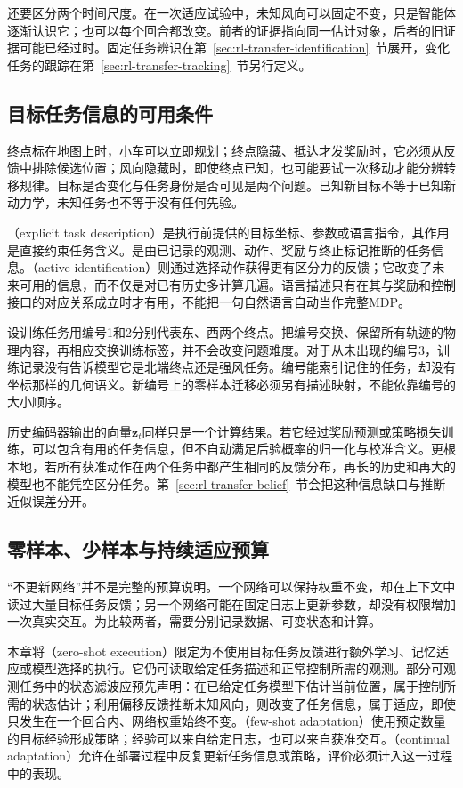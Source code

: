 还要区分两个时间尺度。在一次适应试验中，未知风向可以固定不变，只是智能体逐渐认识它；也可以每个回合都改变。前者的证据指向同一估计对象，后者的旧证据可能已经过时。固定任务辨识在第~\ref{sec:rl-transfer-identification}~节展开，变化任务的跟踪在第~\ref{sec:rl-transfer-tracking}~节另行定义。

\subsection{目标任务信息的可用条件}
\label{sec:rl-transfer-information}

终点标在地图上时，小车可以立即规划；终点隐藏、抵达才发奖励时，它必须从反馈中排除候选位置；风向隐藏时，即使终点已知，也可能要试一次移动才能分辨转移规律。目标是否变化与任务身份是否可见是两个问题。已知新目标不等于已知新动力学，未知任务也不等于没有任何先验。

（explicit task description）是执行前提供的目标坐标、参数或语言指令，其作用是直接约束任务含义。是由已记录的观测、动作、奖励与终止标记推断的任务信息。（active identification）则通过选择动作获得更有区分力的反馈；它改变了未来可用的信息，而不仅是对已有历史多计算几遍。语言描述只有在其与奖励和控制接口的对应关系成立时才有用，不能把一句自然语言自动当作完整MDP。

设训练任务用编号1和2分别代表东、西两个终点。把编号交换、保留所有轨迹的物理内容，再相应交换训练标签，并不会改变问题难度。对于从未出现的编号3，训练记录没有告诉模型它是北端终点还是强风任务。编号能索引记住的任务，却没有坐标那样的几何语义。新编号上的零样本迁移必须另有描述映射，不能依靠编号的大小顺序。

历史编码器输出的向量$\bm z_t$同样只是一个计算结果。若它经过奖励预测或策略损失训练，可以包含有用的任务信息，但不自动满足后验概率的归一化与校准含义。更根本地，若所有获准动作在两个任务中都产生相同的反馈分布，再长的历史和再大的模型也不能凭空区分任务。第~\ref{sec:rl-transfer-belief}~节会把这种信息缺口与推断近似误差分开。

\subsection{零样本、少样本与持续适应预算}
\label{sec:rl-transfer-budget}

“不更新网络”并不是完整的预算说明。一个网络可以保持权重不变，却在上下文中读过大量目标任务反馈；另一个网络可能在固定日志上更新参数，却没有权限增加一次真实交互。为比较两者，需要分别记录数据、可变状态和计算。

本章将（zero-shot execution）限定为不使用目标任务反馈进行额外学习、记忆适应或模型选择的执行。它仍可读取给定任务描述和正常控制所需的观测。部分可观测任务中的状态滤波应预先声明：在已给定任务模型下估计当前位置，属于控制所需的状态估计；利用偏移反馈推断未知风向，则改变了任务信息，属于适应，即使只发生在一个回合内、网络权重始终不变。（few-shot adaptation）使用预定数量的目标经验形成策略；经验可以来自给定日志，也可以来自获准交互。（continual adaptation）允许在部署过程中反复更新任务信息或策略，评价必须计入这一过程中的表现。

